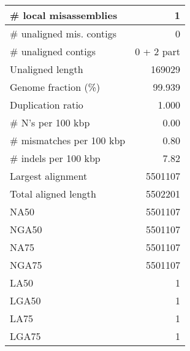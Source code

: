 \documentclass[12pt,a4paper]{article}
\begin{document}
\begin{table}[ht]
\begin{center}
\begin{tabular}{|l*{1}{|r}|}
\# local misassemblies & 1 \\ \hline
\# unaligned mis. contigs & 0 \\ \hline
\# unaligned contigs & 0 + 2 part \\ \hline
Unaligned length & 169029 \\ \hline
Genome fraction (\%) & 99.939 \\ \hline
Duplication ratio & 1.000 \\ \hline
\# N's per 100 kbp & 0.00 \\ \hline
\# mismatches per 100 kbp & 0.80 \\ \hline
\# indels per 100 kbp & 7.82 \\ \hline
Largest alignment & 5501107 \\ \hline
Total aligned length & 5502201 \\ \hline
NA50 & 5501107 \\ \hline
NGA50 & 5501107 \\ \hline
NA75 & 5501107 \\ \hline
NGA75 & 5501107 \\ \hline
LA50 & 1 \\ \hline
LGA50 & 1 \\ \hline
LA75 & 1 \\ \hline
LGA75 & 1 \\ \hline
\end{tabular}
\end{center}
\end{table}
\end{document}
